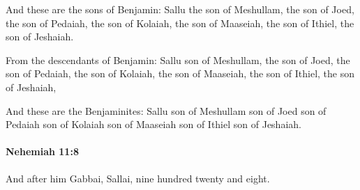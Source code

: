 			\begin{versebox}
					\item[BHS] 
					\item[LXX] 
					\item[ASV] And these are the sons of Benjamin: Sallu the son of Meshullam, the son of Joed, the son of Pedaiah, the son of Kolaiah, the son of Maaseiah, the son of Ithiel, the son of Jeshaiah.
					\item[NIV] From the descendants of Benjamin: Sallu son of Meshullam, the son of Joed, the son of Pedaiah, the son of Kolaiah, the son of Maaseiah, the son of Ithiel, the son of Jeshaiah,
					\item[NRSV] And these are the Benjaminites: Sallu son of Meshullam son of Joed son of Pedaiah son of Kolaiah son of Maaseiah son of Ithiel son of Jeshaiah.
			\end{versebox}

		\paragraph{Nehemiah 11:8} %
			\label{NEHEMIAH-11-8}

			And after him Gabbai, Sallai, nine hundred twenty and eight.

